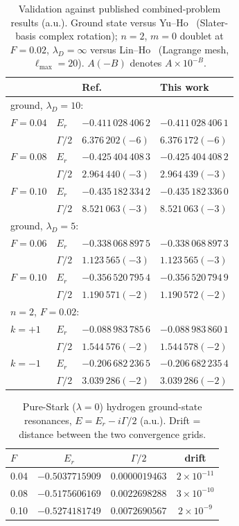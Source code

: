 \documentclass[aps,pra,twocolumn,superscriptaddress,floatfix,longbibliography]{revtex4-2}
\begin{document}
\begin{table}[tb]
\caption{\label{tab:lit}Validation against published combined-problem
results (a.u.). Ground state versus Yu--Ho~\cite{YuHo2005}
(Slater-basis complex rotation); $n=2$, $m=0$ doublet at $F=0.02$,
$\lambda_D=\infty$ versus Lin--Ho~\cite{LinHo2011} (Lagrange mesh,
$\ell_{\max}=20$). $A(-B)$ denotes $A\times10^{-B}$.}
\begin{ruledtabular}
\begin{tabular}{llll}
 & & Ref. & This work \\
\hline
\multicolumn{4}{l}{ground, $\lambda_D=10$:} \\
$F=0.04$ & $E_r$ & $-0.411\,028\,406\,2$ & $-0.411\,028\,406\,1$ \\
 & $\Gamma/2$ & $6.376\,202(-6)$ & $6.376\,172(-6)$ \\
$F=0.08$ & $E_r$ & $-0.425\,404\,408\,3$ & $-0.425\,404\,408\,2$ \\
 & $\Gamma/2$ & $2.964\,440(-3)$ & $2.964\,439(-3)$ \\
$F=0.10$ & $E_r$ & $-0.435\,182\,334\,2$ & $-0.435\,182\,336\,0$ \\
 & $\Gamma/2$ & $8.521\,063(-3)$ & $8.521\,063(-3)$ \\
\multicolumn{4}{l}{ground, $\lambda_D=5$:} \\
$F=0.06$ & $E_r$ & $-0.338\,068\,897\,5$ & $-0.338\,068\,897\,3$ \\
 & $\Gamma/2$ & $1.123\,565(-3)$ & $1.123\,565(-3)$ \\
$F=0.10$ & $E_r$ & $-0.356\,520\,795\,4$ & $-0.356\,520\,794\,9$ \\
 & $\Gamma/2$ & $1.190\,571(-2)$ & $1.190\,572(-2)$ \\
\multicolumn{4}{l}{$n=2$, $F=0.02$:} \\
$k=+1$ & $E_r$ & $-0.088\,983\,785\,6$ & $-0.088\,983\,860\,1$ \\
 & $\Gamma/2$ & $1.544\,576(-2)$ & $1.544\,578(-2)$ \\
$k=-1$ & $E_r$ & $-0.206\,682\,236\,5$ & $-0.206\,682\,235\,4$ \\
 & $\Gamma/2$ & $3.039\,286(-2)$ & $3.039\,286(-2)$ \\
\end{tabular}
\end{ruledtabular}
\end{table}

\begin{table}[tb]
\caption{\label{tab:anchors}Pure-Stark ($\lambda=0$) hydrogen
ground-state resonances, $E=E_r-i\Gamma/2$ (a.u.). Drift = distance
between the two convergence grids.}
\begin{ruledtabular}
\begin{tabular}{lccc}
$F$ & $E_r$ & $\Gamma/2$ & drift \\
\hline
0.04 & $-0.5037715909$ & $0.0000019463$ & $2\times10^{-11}$ \\
0.08 & $-0.5175606169$ & $0.0022698288$ & $3\times10^{-10}$ \\
0.10 & $-0.5274181749$ & $0.0072690567$ & $2\times10^{-9}$ \\
\end{tabular}
\end{ruledtabular}
\end{table}
\end{document}
